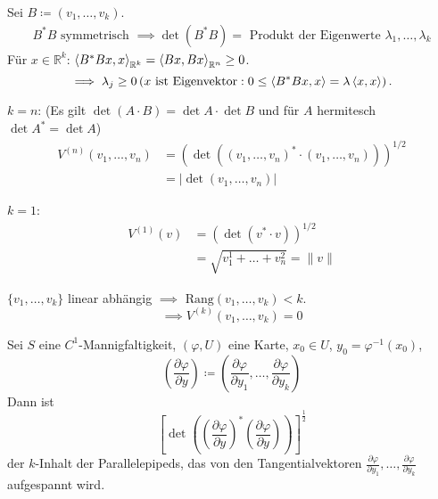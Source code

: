 \begin{notice} \label{thm:11.2}
  \begin{enum-arab}
    \item Sei $B \coloneq (v_1 ,\ldots, v_k)$.
    \begin{align*}
      B^* B \text{ symmetrisch } \implies \det(B^* B) = \text{ Produkt der Eigenwerte } \lambda_1, \ldots, \lambda_k
    \end{align*}
    Für $x \in \mathbb{R}^k$: $\braket{B^* B x, x}_{\mathbb{R}^k} = \braket{B x, B x}_{\mathbb{R}^n} \geq 0$. \[ \implies \lambda_j \geq 0 \left( x \text{ ist Eigenvektor} : 0 \leq \braket{B^* B x, x} = \lambda \braket{x, x} \right). \]
    
    \item $k=n$: (Es gilt $\det(A \cdot B) = \det A \cdot \det B$ und für $A$ hermitesch $\det A^* = \det A$)
    \begin{align*}
      V^{(n)}(v_1 ,\ldots, v_n)
      &= \left(\det \left( (v_1 ,\ldots, v_n)^* \cdot (v_1 ,\ldots, v_n)\right)\right)^{1/2} \\
      &= \left| \det (v_1 ,\ldots, v_n) \right|
    \end{align*}
    
    \item $k=1$:
    \begin{align*}
      V^{(1)}(v)
      &= \left( \det(v^* \cdot v) \right)^{1/2} \\
      &= \sqrt{v_1^1 + \ldots + v_n^2}
      = \|v\|
    \end{align*}
    
    \item $\{ v_1 ,\ldots, v_k \}$ linear abhängig $\implies$ $\mathrm{Rang}(v_1,\ldots,v_k) < k$. \[ \implies V^{(k)}(v_1,\ldots,v_k) = 0 \]
    
    \item Sei $S$ eine $C^1$-Mannigfaltigkeit, $(\varphi,U)$ eine Karte, $x_0 \in U$, $y_0 = \varphi^{-1}(x_0)$,\[ \left(\frac{\partial \varphi}{\partial y}\right) \coloneq \left( \frac{\partial \varphi}{\partial y_1},\ldots,\frac{\partial \varphi}{\partial y_k} \right) \]
    Dann ist \[ \left[ \det \left( \left( \frac{\partial \varphi}{\partial y} \right)^* \left( \frac{\partial \varphi}{\partial y} \right) \right) \right]^{\frac 12} \]
    der $k$-Inhalt der Parallelepipeds, das von den Tangentialvektoren $\frac{\partial \varphi}{\partial y_1},\ldots,\frac{\partial \varphi}{\partial y_k}$ aufgespannt wird.
  \end{enum-arab}
\end{notice}

